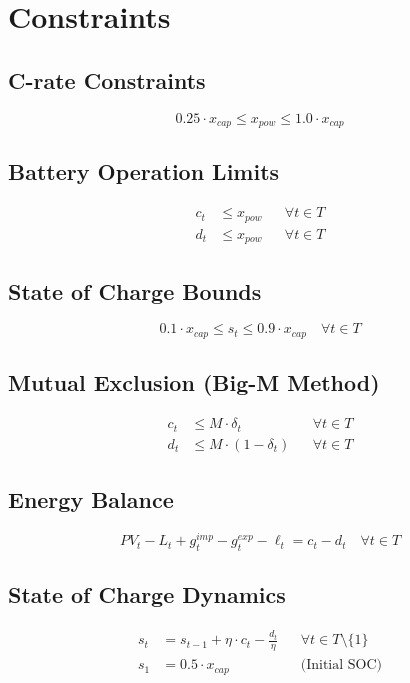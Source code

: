 \documentclass{article}
\begin{document}
\section{Constraints}

\subsection{C-rate Constraints}
\begin{equation}
0.25 \cdot x_{cap} \leq x_{pow} \leq 1.0 \cdot x_{cap}
\end{equation}

\subsection{Battery Operation Limits}
\begin{align}
c_t &\leq x_{pow} && \forall t \in T\\
d_t &\leq x_{pow} && \forall t \in T
\end{align}

\subsection{State of Charge Bounds}
\begin{equation}
0.1 \cdot x_{cap} \leq s_t \leq 0.9 \cdot x_{cap} \quad \forall t \in T
\end{equation}

\subsection{Mutual Exclusion (Big-M Method)}
\begin{align}
c_t &\leq M \cdot \delta_t && \forall t \in T\\
d_t &\leq M \cdot (1 - \delta_t) && \forall t \in T
\end{align}

\subsection{Energy Balance}
\begin{equation}
PV_t - L_t + g^{imp}_t - g^{exp}_t - \ell_t = c_t - d_t \quad \forall t \in T
\end{equation}

\subsection{State of Charge Dynamics}
\begin{align}
s_t &= s_{t-1} + \eta \cdot c_t - \frac{d_t}{\eta} && \forall t \in T \setminus \{1\}\\
s_1 &= 0.5 \cdot x_{cap} && \text{(Initial SOC)}
\end{align}
\end{document}
